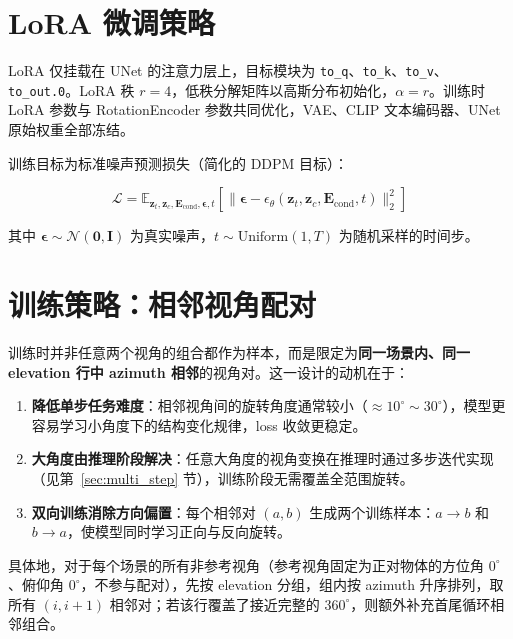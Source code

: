 \section{LoRA 微调策略}

LoRA 仅挂载在 UNet 的注意力层上，目标模块为 \texttt{to\_q}、\texttt{to\_k}、\texttt{to\_v}、\texttt{to\_out.0}。LoRA 秩 $r = 4$，低秩分解矩阵以高斯分布初始化，$\alpha = r$。训练时 LoRA 参数与 RotationEncoder 参数共同优化，VAE、CLIP 文本编码器、UNet 原始权重全部冻结。

训练目标为标准噪声预测损失（简化的 DDPM 目标）：

\begin{equation}
    \mathcal{L} = \mathbb{E}_{\mathbf{z}_t, \mathbf{z}_c, \mathbf{E}_{\text{cond}}, \boldsymbol{\epsilon}, t}\left[ \|\boldsymbol{\epsilon} - \epsilon_\theta(\mathbf{z}_t, \mathbf{z}_c, \mathbf{E}_{\text{cond}}, t)\|_2^2 \right]
\end{equation}

其中 $\boldsymbol{\epsilon} \sim \mathcal{N}(\mathbf{0}, \mathbf{I})$ 为真实噪声，$t \sim \text{Uniform}(1, T)$ 为随机采样的时间步。

\section{训练策略：相邻视角配对}

训练时并非任意两个视角的组合都作为样本，而是限定为\textbf{同一场景内、同一 elevation 行中 azimuth 相邻}的视角对。这一设计的动机在于：

\begin{enumerate}[label=(\arabic*)]
    \item \textbf{降低单步任务难度}：相邻视角间的旋转角度通常较小（$\approx 10^\circ \sim 30^\circ$），模型更容易学习小角度下的结构变化规律，loss 收敛更稳定。
    \item \textbf{大角度由推理阶段解决}：任意大角度的视角变换在推理时通过多步迭代实现（见第~\ref{sec:multi_step} 节），训练阶段无需覆盖全范围旋转。
    \item \textbf{双向训练消除方向偏置}：每个相邻对 $(a, b)$ 生成两个训练样本：$a \to b$ 和 $b \to a$，使模型同时学习正向与反向旋转。
\end{enumerate}

具体地，对于每个场景的所有非参考视角（参考视角固定为正对物体的方位角 $0^\circ$、俯仰角 $0^\circ$，不参与配对），先按 elevation 分组，组内按 azimuth 升序排列，取所有 $(i, i+1)$ 相邻对；若该行覆盖了接近完整的 $360^\circ$，则额外补充首尾循环相邻组合。

